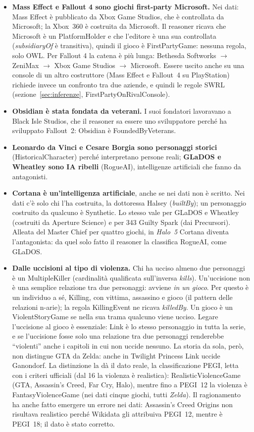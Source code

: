 \documentclass[10pt,a4paper]{article}
\newcommand{\cls}[1]{\textsf{#1}}
\newcommand{\prop}[1]{\textit{#1}}
\begin{document}
\begin{itemize}
  \item \textbf{Mass Effect e Fallout 4 sono giochi first-party Microsoft.} Nei dati: Mass Effect è pubblicato da Xbox Game Studios, che è controllata da Microsoft; la Xbox~360 è costruita da Microsoft. Il reasoner ricava che Microsoft è un \cls{PlatformHolder} e che l'editore è una sua controllata (\prop{subsidiaryOf} è transitiva), quindi il gioco è \cls{FirstPartyGame}: nessuna regola, solo OWL. Per Fallout 4 la catena è più lunga: Bethesda Softworks $\to$ ZeniMax $\to$ Xbox Game Studios $\to$ Microsoft. Essere uscito anche su una console di un altro costruttore (Mass Effect e Fallout~4 su PlayStation) richiede invece un confronto tra due aziende, e quindi le regole SWRL (sezione~\ref{sec:inferenze}, \cls{FirstPartyOnRivalConsole}).
  \item \textbf{Obsidian è stata fondata da veterani.} I suoi fondatori lavoravano a Black Isle Studios, che il reasoner sa essere uno sviluppatore perché ha sviluppato Fallout~2: Obsidian è \cls{FoundedByVeterans}.
  \item \textbf{Leonardo da Vinci e Cesare Borgia sono personaggi storici} (\cls{HistoricalCharacter}) perché interpretano persone reali; \textbf{GLaDOS e Wheatley sono IA ribelli} (\cls{RogueAI}), intelligenze artificiali che fanno da antagonisti.
  \item \textbf{Cortana è un'intelligenza artificiale}, anche se nei dati non è scritto. Nei dati c'è solo chi l'ha costruita, la dottoressa Halsey (\prop{builtBy}); un personaggio costruito da qualcuno è \cls{Synthetic}. Lo stesso vale per GLaDOS e Wheatley (costruiti da Aperture Science) e per 343 Guilty Spark (dai Precursori). Alleata del Master Chief per quattro giochi, in \emph{Halo~5} Cortana diventa l'antagonista: da quel solo fatto il reasoner la classifica \cls{RogueAI}, come GLaDOS.
  \item \textbf{Dalle uccisioni al tipo di violenza.} Chi ha ucciso almeno due personaggi è un \cls{MultipleKiller} (cardinalità qualificata sull'inversa \prop{kills}). Un'uccisione non è una semplice relazione tra due personaggi: avviene \emph{in un gioco}. Per questo è un individuo a sé, \cls{Killing}, con vittima, assassino e gioco (il pattern delle relazioni n-arie); la regola \textsf{KillingEvent} ne ricava \prop{killedBy}. Un gioco è un \cls{ViolentStoryGame} se nella sua trama qualcuno viene ucciso. Legare l'uccisione al gioco è essenziale: Link è lo stesso personaggio in tutta la serie, e se l'uccisione fosse solo una relazione tra due personaggi renderebbe ``violenti'' anche i capitoli in cui non uccide nessuno. La storia da sola, però, non distingue GTA da Zelda: anche in Twilight Princess Link uccide Ganondorf. La distinzione la dà il dato reale, la classificazione PEGI, letta con i criteri ufficiali (dal 16 la violenza è realistica): \cls{RealisticViolenceGame} (GTA, Assassin's Creed, Far Cry, Halo), mentre fino a PEGI~12 la violenza è \cls{FantasyViolenceGame} (nei dati cinque giochi, tutti \emph{Zelda}). Il ragionamento ha anche fatto emergere un errore nei dati: Assassin's Creed Origins non risultava realistico perché Wikidata gli attribuiva PEGI~12, mentre è PEGI~18; il dato è stato corretto.

\end{itemize}
\end{document}
